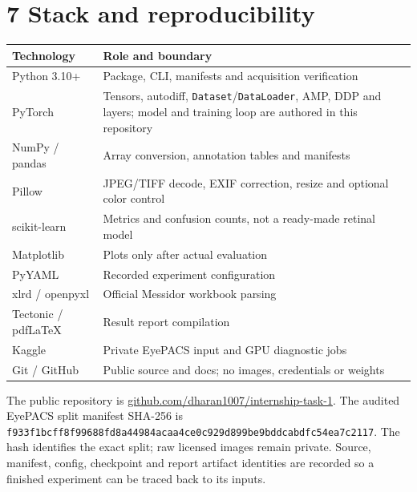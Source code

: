\documentclass[10pt,a4paper]{article}
\newcommand{\code}[1]{\texttt{\small #1}}
\begin{document}
\section*{\color{ink}7 \quad Stack and reproducibility}
\small
\begin{tabularx}{\linewidth}{@{}p{.27\linewidth}Y@{}}
\toprule
Technology & Role and boundary\\
\midrule
Python 3.10+ & Package, CLI, manifests and acquisition verification\\
PyTorch & Tensors, autodiff, \code{Dataset}/\code{DataLoader}, AMP, DDP and
layers; model and training loop are authored in this repository\\
NumPy / pandas & Array conversion, annotation tables and manifests\\
Pillow & JPEG/TIFF decode, EXIF correction, resize and optional color control\\
scikit-learn & Metrics and confusion counts, not a ready-made retinal model\\
Matplotlib & Plots only after actual evaluation\\
PyYAML & Recorded experiment configuration\\
xlrd / openpyxl & Official Messidor workbook parsing\\
Tectonic / pdfLaTeX & Result report compilation\\
Kaggle & Private EyePACS input and GPU diagnostic jobs\\
Git / GitHub & Public source and docs; no images, credentials or weights\\
\bottomrule
\end{tabularx}
\normalsize

The public repository is
\href{https://github.com/dharan1007/internship-task-1}{github.com/dharan1007/internship-task-1}.
The audited EyePACS split manifest SHA-256 is
{\scriptsize\code{f933f1bcff8f99688fd8a44984acaa4ce0c929d899be9bddcabdfc54ea7c2117}}.
The hash identifies the exact split; raw licensed images remain private.
Source, manifest, config, checkpoint and report artifact identities are
recorded so a finished experiment can be traced back to its inputs.


\newpage
\end{document}

